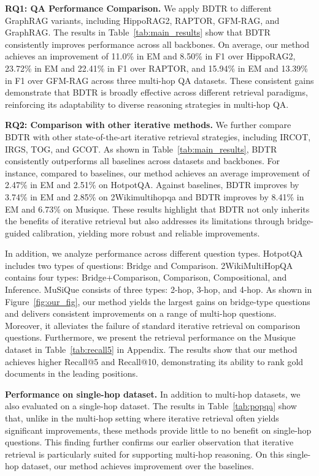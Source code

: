 \documentclass{article} %
\begin{document}
\noindent \textbf{RQ1: QA Performance Comparison.}  
We apply BDTR to different GraphRAG variants, including HippoRAG2, RAPTOR, GFM-RAG, and GraphRAG. The results in Table~\ref{tab:main_results} show that BDTR consistently improves performance across all backbones. On average, our method achieves an improvement of 11.0\% in EM and 8.50\% in F1 over HippoRAG2, 23.72\% in EM and 22.41\% in F1 over RAPTOR, and 15.94\% in EM and 13.39\% in F1 over GFM-RAG across three multi-hop QA datasets. These consistent gains demonstrate that BDTR is broadly effective across different retrieval paradigms, reinforcing its adaptability to diverse reasoning strategies in multi-hop QA.

\noindent \textbf{RQ2: Comparison with other iterative methods.}  
We further compare BDTR with other state-of-the-art iterative retrieval strategies, including IRCOT, IRGS, TOG, and GCOT. As shown in Table~\ref{tab:main_results}, BDTR consistently outperforms all baselines across datasets and backbones. For instance, compared to baselines, our method achieves an average improvement of 2.47\% in EM and 2.51\% on HotpotQA. Against baselines, BDTR improves by 3.74\% in EM and 2.85\% on 2Wikimultihopqa and BDTR improves by 8.41\% in EM and 6.73\% on Musique. These results highlight that BDTR not only inherits the benefits of iterative retrieval but also addresses its limitations through bridge-guided calibration, yielding more robust and reliable improvements.

In addition, we analyze performance across different question types. HotpotQA includes two types of questions: Bridge and Comparison. 2WikiMultiHopQA contains four types: Bridge+Comparison, Comparison, Compositional, and Inference. MuSiQue consists of three types: 2-hop, 3-hop, and 4-hop.  
As shown in Figure~\ref{fig:our_fig}, our method yields the largest gains on bridge-type questions and delivers consistent improvements on a range of multi-hop questions. Moreover, it alleviates the failure of standard iterative retrieval on comparison questions. Furthermore, we present the retrieval performance on the Musique dataset in Table~\ref{tab:recall5} in Appendix. The results show that our method achieves higher Recall@5 and Recall@10, demonstrating its ability to rank gold documents in the leading positions.

\noindent \textbf{Performance on single-hop dataset.}
In addition to multi-hop datasets, we also evaluated on a single-hop dataset. The results in Table~\ref{tab:popqa} show that, unlike in the multi-hop setting where iterative retrieval often yields significant improvements, these methods provide little to no benefit on single-hop questions. This finding further confirms our earlier observation that iterative retrieval is particularly suited for supporting multi-hop reasoning. On this single-hop dataset, our method achieves  improvement over the baselines.
\end{document}
